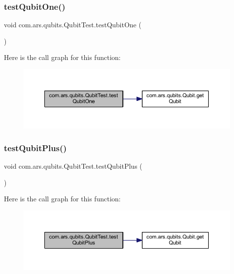 \subsubsection{\texorpdfstring{test\+Qubit\+One()}{testQubitOne()}}
{\footnotesize\ttfamily void com.\+ars.\+qubits.\+Qubit\+Test.\+test\+Qubit\+One (\begin{DoxyParamCaption}{ }\end{DoxyParamCaption})}

Here is the call graph for this function\+:\nopagebreak
\begin{figure}[H]
\begin{center}
\leavevmode
\includegraphics[width=350pt]{classcom_1_1ars_1_1qubits_1_1_qubit_test_a2719401cc0f28a3c9676337dca71118d_cgraph}
\end{center}
\end{figure}
\hypertarget{classcom_1_1ars_1_1qubits_1_1_qubit_test_a389dff5ee932a806b76703b63b60e3d9}{}\label{classcom_1_1ars_1_1qubits_1_1_qubit_test_a389dff5ee932a806b76703b63b60e3d9} 
\subsubsection{\texorpdfstring{test\+Qubit\+Plus()}{testQubitPlus()}}
{\footnotesize\ttfamily void com.\+ars.\+qubits.\+Qubit\+Test.\+test\+Qubit\+Plus (\begin{DoxyParamCaption}{ }\end{DoxyParamCaption})}

Here is the call graph for this function\+:\nopagebreak
\begin{figure}[H]
\begin{center}
\leavevmode
\includegraphics[width=350pt]{classcom_1_1ars_1_1qubits_1_1_qubit_test_a389dff5ee932a806b76703b63b60e3d9_cgraph}
\end{center}
\end{figure}
\hypertarget{classcom_1_1ars_1_1qubits_1_1_qubit_test_afd0454df241a37488becb51d06c76f25}{}\label{classcom_1_1ars_1_1qubits_1_1_qubit_test_afd0454df241a37488becb51d06c76f25} 
